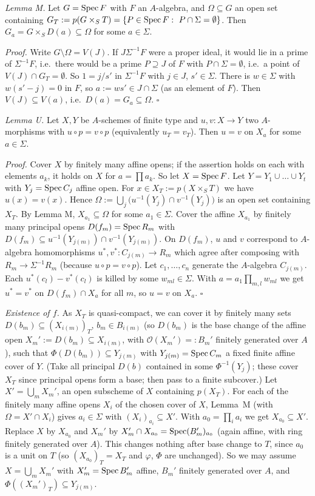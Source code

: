 \documentclass[11pt]{article}
\begin{document}
\emph{Lemma M.} Let $G=\operatorname{Spec} F$ with $F$ an $A$-algebra, and $\Omega\subseteq G$ an open set containing $G_T:=p(G\times_ST)=\{P\in\Spec F:\ P\cap\Sigma=\emptyset\}$. Then $G_a=G\times_SD(a)\subseteq\Omega$ for some $a\in\Sigma$.

\emph{Proof.} Write $G\setminus\Omega=V(J)$. If $J\Sigma^{-1}F$ were a proper ideal, it would lie in a prime of $\Sigma^{-1}F$, i.e.\ there would be a prime $P\supseteq J$ of $F$ with $P\cap\Sigma=\emptyset$, i.e.\ a point of $V(J)\cap G_T=\emptyset$. So $1=j/s'$ in $\Sigma^{-1}F$ with $j\in J$, $s'\in\Sigma$. There is $w\in\Sigma$ with $w(s'-j)=0$ in $F$, so $a:=ws'\in J\cap\Sigma$ (as an element of $F$). Then $V(J)\subseteq V(a)$, i.e.\ $D(a)=G_a\subseteq\Omega$. \hfill$\square$

\emph{Lemma U.} Let $X,Y$ be $A$-schemes of finite type and $u,v:X\to Y$ two $A$-morphisms with $u\circ p=v\circ p$ (equivalently $u_T=v_T$). Then $u=v$ on $X_a$ for some $a\in\Sigma$.

\emph{Proof.} Cover $X$ by finitely many affine opens; if the assertion holds on each with elements $a_k$, it holds on $X$ for $a=\prod a_k$. So let $X=\operatorname{Spec} F$. Let $Y=Y_1\cup\dots\cup Y_t$ with $Y_j=\operatorname{Spec} C_j$ affine open. For $x\in X_T:=p(X\times_ST)$ we have $u(x)=v(x)$. Hence $\Omega:=\bigcup_j\bigl(u^{-1}(Y_j)\cap v^{-1}(Y_j)\bigr)$ is an open set containing $X_T$. By Lemma M, $X_{a_1}\subseteq\Omega$ for some $a_1\in\Sigma$. Cover the affine $X_{a_1}$ by finitely many principal opens $D(f_m)=\operatorname{Spec} R_m$ with $D(f_m)\subseteq u^{-1}(Y_{j(m)})\cap v^{-1}(Y_{j(m)})$. On $D(f_m)$, $u$ and $v$ correspond to $A$-algebra homomorphisms $u^*,v^*:C_{j(m)}\to R_m$ which agree after composing with $R_m\to\Sigma^{-1}R_m$ (because $u\circ p=v\circ p$). Let $c_1,\dots,c_n$ generate the $A$-algebra $C_{j(m)}$. Each $u^*(c_l)-v^*(c_l)$ is killed by some $w_{ml}\in\Sigma$. With $a=a_1\prod_{m,l}w_{ml}$ we get $u^*=v^*$ on $D(f_m)\cap X_a$ for all $m$, so $u=v$ on $X_a$. \hfill$\square$

\emph{Existence of $f$.} As $X_T$ is quasi-compact, we can cover it by finitely many sets $D(b_m)\subseteq(X_{i(m)})_T$, $b_m\in B_{i(m)}$ (so $D(b_m)$ is the base change of the affine open $X_m':=D(b_m)\subseteq X_{i(m)}$, with $\mathcal O(X_m')=:B_m'$ finitely generated over $A$), such that $\Phi(D(b_m))\subseteq Y_{j(m)}$ with $Y_{j(m)}=\operatorname{Spec} C_{m}$ a fixed finite affine cover of $Y$. (Take all principal $D(b)$ contained in some $\Phi^{-1}(Y_j)$; these cover $X_T$ since principal opens form a base; then pass to a finite subcover.) Let $X'=\bigcup_mX_m'$, an open subscheme of $X$ containing $p(X_T)$. For each of the finitely many affine opens $X_i$ of the chosen cover of $X$, Lemma~M (with $\Omega=X'\cap X_i$) gives $a_i\in\Sigma$ with $(X_i)_{a_i}\subseteq X'$. With $a_0=\prod_ia_i$ we get $X_{a_0}\subseteq X'$. Replace $X$ by $X_{a_0}$ and $X_m'$ by $X_m'\cap X_{a_0}=\operatorname{Spec}(B_m')_{a_0}$ (again affine, with ring finitely generated over $A$). This changes nothing after base change to $T$, since $a_0$ is a unit on $T$ (so $(X_{a_0})_T=X_T$ and $\varphi$, $\Phi$ are unchanged). So we may assume $X=\bigcup_mX_m'$ with $X_m'=\operatorname{Spec} B_m'$ affine, $B_m'$ finitely generated over $A$, and $\Phi((X_m')_T)\subseteq Y_{j(m)}$.
\end{document}
